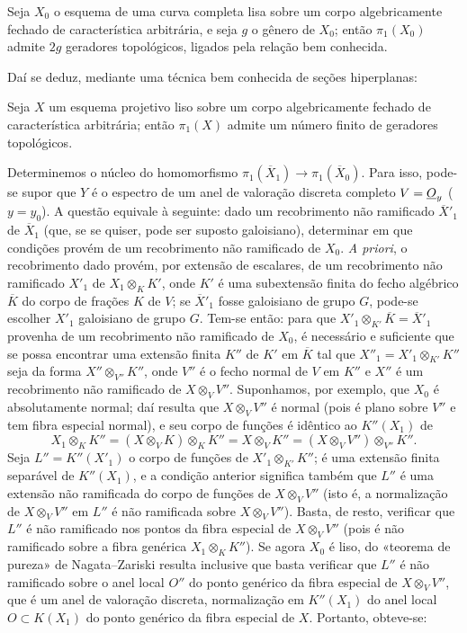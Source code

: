  Seja $X_0$ o esquema de uma curva completa lisa sobre
um corpo algebricamente fechado de característica arbitrária, e seja $g$ o
gênero de $X_0$; então $\pi_1(X_0)$ admite $2g$ geradores topológicos,
ligados pela relação bem conhecida.

Daí se deduz, mediante uma técnica bem conhecida de seções
hiperplanas:

 Seja $X$ um esquema projetivo liso sobre um corpo
algebricamente fechado de característica arbitrária; então $\pi_1(X)$
admite um número finito de geradores topológicos.

Determinemos o núcleo do homomorfismo
$\pi_1(\overline X_1)\longrightarrow\pi_1(\overline X_0)$. Para isso, pode-se
supor que $Y$ é o espectro de um anel de valoração discreta completo
$V=\underline{O}_y$ ($y=y_0$). A questão equivale à seguinte: dado um recobrimento
não ramificado $\overline X'_1$ de $\overline X_1$ (que, se se quiser, pode
ser suposto galoisiano), determinar em que condições provém de um
recobrimento não ramificado de $X_0$. \textit{A priori}, o recobrimento dado
provém, por extensão de escalares, de um recobrimento não ramificado $X'_1$
de $X_1\otimes_K K'$, onde $K'$ é uma subextensão finita do fecho
algébrico $\overline K$ do corpo de frações $K$ de $V$; se
$\overline X'_1$ fosse galoisiano de grupo $G$, pode-se escolher $X'_1$
galoisiano de grupo $G$. Tem-se então: para que
$X'_1\otimes_{K'}\overline K=\overline X'_1$ provenha de um recobrimento não
ramificado de $X_0$, é necessário e suficiente que se possa encontrar uma extensão
finita $K''$ de $K'$ em $\overline K$ tal que
$X''_1=X'_1\otimes_{K'}K''$ seja da forma $X''\otimes_{V''}K''$, onde $V''$
é o fecho normal de $V$ em $K''$ e $X''$ é um recobrimento não ramificado
de $X\otimes_VV''$. Suponhamos, por exemplo, que $X_0$ é absolutamente normal;
daí resulta que $X\otimes_VV''$ é normal (pois é plano sobre $V''$ e tem
fibra especial normal), e seu corpo de funções é idêntico ao $K''(X_1)$ de
\[
  X_1\otimes_KK''
  =(X\otimes_VK)\otimes_KK''
  =X\otimes_VK''
  =(X\otimes_VV'')\otimes_{V''}K''.
\]
Seja $L''=K''(X'_1)$ o corpo de funções de $X'_1\otimes_{K'}K''$; é uma
extensão finita separável de $K''(X_1)$, e a condição anterior significa
também que $L''$ é uma extensão não ramificada do corpo de funções de
$X\otimes_VV''$ (isto é, a normalização de $X\otimes_VV''$ em $L''$ é não
ramificada sobre $X\otimes_VV''$). Basta, de resto, verificar que $L''$ é
não ramificado nos pontos da fibra especial de $X\otimes_VV''$ (pois é não
ramificado sobre a fibra genérica $X_1\otimes_KK''$). Se agora $X_0$ é liso,
do «teorema de pureza» de Nagata--Zariski resulta inclusive que basta verificar
que $L''$ é não ramificado sobre o anel local $O''$ do ponto genérico da
fibra especial de $X\otimes_VV''$, que é um anel de valoração discreta,
normalização em $K''(X_1)$ do anel local $O\subset K(X_1)$ do ponto
genérico da fibra especial de $X$. Portanto, obteve-se:

